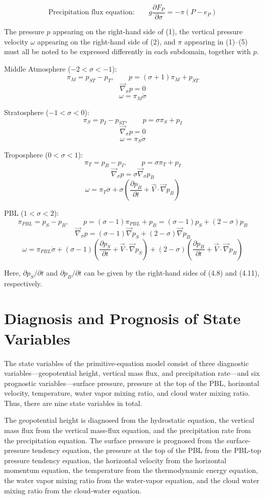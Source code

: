 \documentclass[12pt,openany]{book}
\begin{document}
\begin{equation}
\text{Precipitation flux equation:}\qquad
g \frac{\partial F_P}{\partial \sigma}
=
-
\pi (P - e_P)
\tag{6.5}
\label{eq:6.5}
\end{equation}

The pressure $p$ appearing on the right-hand side of (1),
the vertical pressure velocity $\omega$ appearing on the right-hand side of (2),
and $\pi$ appearing in (1)--(5)
must all be noted to be expressed differently in each subdomain,
together with $p$.

Middle Atmosphere ($-2 < \sigma < -1$):
\[
\pi_M = p_{ST} - p_T ,
\qquad
p = (\sigma + 1)\pi_M + p_{ST}
\]
\[
\vec{\nabla}_{\sigma} p = 0
\]
\[
\omega = \pi_M \dot{\sigma}
\]

Stratosphere ($-1 < \sigma < 0$):
\[
\pi_S = p_I - p_{ST},
\qquad
p = \sigma \pi_S + p_I
\]
\[
\vec{\nabla}_{\sigma} p = 0
\]
\[
\omega = \pi_S \dot{\sigma}
\]

Troposphere ($0 < \sigma < 1$):
\[
\pi_T = p_B - p_I,
\qquad
p = \sigma \pi_T + p_I
\]
\[
\vec{\nabla}_{\sigma} p = \sigma \vec{\nabla}_{\sigma} p_B
\]
\[
\omega
=
\pi_T \dot{\sigma}
+
\sigma
\left(
\frac{\partial p_B}{\partial t}
+
\vec{V} \cdot \vec{\nabla} p_B
\right)
\]

PBL ($1 < \sigma < 2$):
\[
\pi_{PBL} = p_S - p_B ,
\qquad
p = (\sigma - 1)\pi_{PBL} + p_B
= (\sigma - 1)p_S + (2 - \sigma)p_B
\]
\[
\vec{\nabla}_{\sigma} p
=
(\sigma - 1)\vec{\nabla} p_S
+
(2 - \sigma)\vec{\nabla} p_B
\]
\[
\omega
=
\pi_{PBL} \dot{\sigma}
+
(\sigma - 1)
\left(
\frac{\partial p_S}{\partial t}
+
\vec{V} \cdot \vec{\nabla} p_S
\right)
+
(2 - \sigma)
\left(
\frac{\partial p_B}{\partial t}
+
\vec{V} \cdot \vec{\nabla} p_B
\right)
\]

Here,
$\partial p_S / \partial t$ and $\partial p_B / \partial t$
can be given by the right-hand sides of (4.8) and (4.11), respectively.

\chapter{Diagnosis and Prognosis of State Variables}

The state variables of the primitive-equation model consist of three
diagnostic variables—geopotential height, vertical mass flux, and
precipitation rate—and six prognostic variables—surface pressure,
pressure at the top of the PBL, horizontal velocity, temperature,
water vapor mixing ratio, and cloud water mixing ratio. Thus, there are
nine state variables in total.

The geopotential height is diagnosed from the hydrostatic equation, the
vertical mass flux from the vertical mass-flux equation, and the
precipitation rate from the precipitation equation. The surface
pressure is prognosed from the surface-pressure tendency equation, the
pressure at the top of the PBL from the PBL-top pressure tendency
equation, the horizontal velocity from the horizontal momentum
equation, the temperature from the thermodynamic energy equation, the
water vapor mixing ratio from the water-vapor equation, and the cloud
water mixing ratio from the cloud-water equation.
\end{document}
